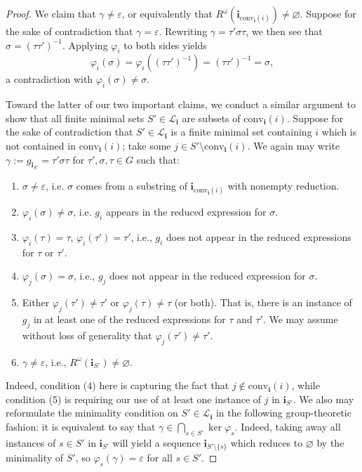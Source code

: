 \documentclass[10pt,a4paper]{amsart}
\begin{document}
\begin{proof}
    We claim that $\gamma\neq\varepsilon$, or equivalently that $R^\omega(\mathbf i_{\text{conv}_\mathbf i(i)})\neq\varnothing$. Suppose for the sake of contradiction that $\gamma=\varepsilon$. Rewriting $\gamma=\tau'\sigma\tau$, we then see that $\sigma=(\tau\tau')^{-1}$. Applying $\varphi_i$ to both sides yields
    $$\varphi_i(\sigma)=\varphi_i((\tau\tau')^{-1})=(\tau\tau')^{-1}=\sigma,$$
    a contradiction with $\varphi_i(\sigma)\neq\sigma$.

    Toward the latter of our two important claims, we conduct a similar argument to show that all finite minimal sets $S'\in\mathcal L_\mathbf i$ are subsets of $\text{conv}_\mathbf i(i)$. Suppose for the sake of contradiction that $S'\in\mathcal L_\mathbf i$ is a finite minimal set containing $i$ which is not contained in $\text{conv}_\mathbf i(i)$; take some $j\in S'\setminus \text{conv}_\mathbf i(i)$. We again may write $\gamma:=g_{\mathbf i_{S'}}=\tau'\sigma\tau$ for $\tau',\sigma,\tau\in G$ such that:
    \begin{enumerate}
        \item $\sigma\neq\varepsilon$, i.e. $\sigma$ comes from a substring of $\mathbf i_{\text{conv}_\mathbf i(i)}$ with nonempty reduction.
        \item $\varphi_i(\sigma)\neq\sigma$, i.e. $g_i$ appears in the reduced expression for $\sigma$.
        \item $\varphi_i(\tau)=\tau$, $\varphi_i(\tau')=\tau'$, i.e., $g_i$ does not appear in the reduced expressions for $\tau$ or $\tau'$.
        \item $\varphi_j(\sigma)=\sigma$, i.e., $g_j$ does not appear in the reduced expression for $\sigma$.
        \item Either $\varphi_j(\tau')\neq\tau'$ or $\varphi_j(\tau)\neq\tau$ (or both). That is, there is an instance of $g_j$ in at least one of the reduced expressions for $\tau$ and $\tau'$. We may assume without loss of generality that $\varphi_j(\tau')\neq\tau'$.
        \item $\gamma\neq\varepsilon$, i.e., $R^\omega(\mathbf i_{S'})\neq\varnothing$.
    \end{enumerate}
    Indeed, condition (4) here is capturing the fact that $j\not\in\text{conv}_\mathbf i(i)$, while condition (5) is requiring our use of at least one instance of $j$ in $\mathbf i_{S'}$. We also may reformulate the minimality condition on $S'\in\mathcal L_\mathbf i$ in the following group-theoretic fashion: it is equivalent to say that $\gamma\in\bigcap_{s\in S'}\ker\varphi_s$. Indeed, taking away all instances of $s\in S'$ in $\mathbf i_{S'}$ will yield a sequence $\mathbf i_{S'\setminus\{s\}}$ which reduces to $\varnothing$ by the minimality of $S'$, so $\varphi_s(\gamma)=\varepsilon$ for all $s\in S'$.


\end{proof}
\end{document}

